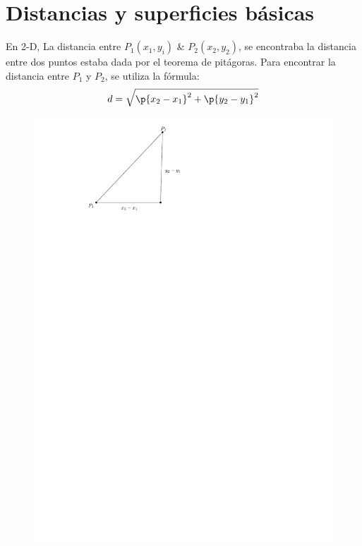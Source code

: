 \section{Distancias y superficies básicas}
En 2-D, La distancia entre $P_1(x_1,y_i)$ \& $P_2(x_2,y_2)$, se encontraba la distancia entre dos puntos estaba dada por el teorema de pitágoras. Para encontrar la distancia entre $\displaystyle P_1$ y $\displaystyle P_2$, se utiliza la fórmula:
\[
  d = \sqrt{\p{x_2-x_1} ^2 + \p{y_2-y_1} ^2}
\]
{
    \begin{figure}[!htb]
        \centering
        \includegraphics[scale=0.75]{Clases/figs/2020-01-23-01}  \qquad \qquad 

\end{figure}}
